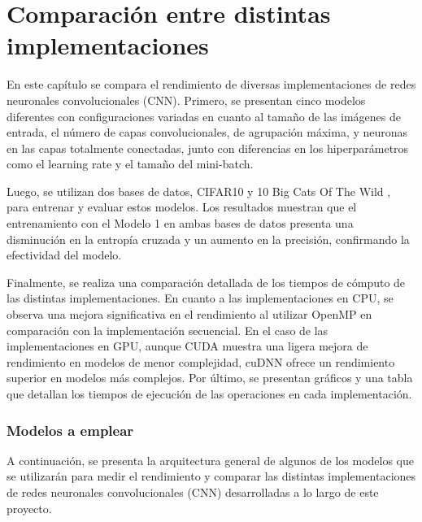 \chapter{Comparación entre distintas implementaciones}

En este capítulo se compara el rendimiento de diversas implementaciones de redes neuronales convolucionales (CNN). Primero, se presentan cinco modelos diferentes con configuraciones variadas en cuanto al tamaño de las imágenes de entrada, el número de capas convolucionales, de agrupación máxima, y neuronas en las capas totalmente conectadas, junto con diferencias en los hiperparámetros como el learning rate y el tamaño del mini-batch.

Luego, se utilizan dos bases de datos, CIFAR10 \cite{cifar10} y 10 Big Cats Of The Wild \cite{10_big_cats}, para entrenar y evaluar estos modelos. Los resultados muestran que el entrenamiento con el Modelo 1 en ambas bases de datos presenta una disminución en la entropía cruzada y un aumento en la precisión, confirmando la efectividad del modelo.

Finalmente, se realiza una comparación detallada de los tiempos de cómputo de las distintas implementaciones. En cuanto a las implementaciones en CPU, se observa una mejora significativa en el rendimiento al utilizar OpenMP en comparación con la implementación secuencial. En el caso de las implementaciones en GPU, aunque CUDA muestra una ligera mejora de rendimiento en modelos de menor complejidad, cuDNN ofrece un rendimiento superior en modelos más complejos. Por último, se presentan gráficos y una tabla que detallan los tiempos de ejecución de las operaciones en cada implementación.

\subsection{Modelos a emplear}

A continuación, se presenta la arquitectura general de algunos de los modelos que se utilizarán para medir el rendimiento y comparar las distintas implementaciones de redes neuronales convolucionales (CNN) desarrolladas a lo largo de este proyecto.

